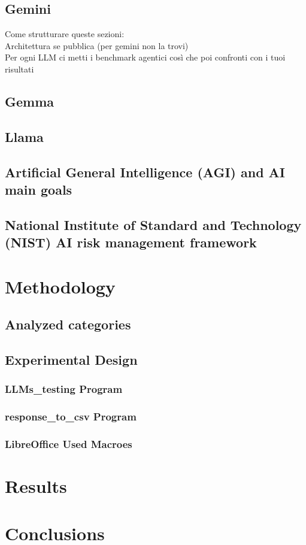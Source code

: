 \documentclass[12pt]{article}
\begin{document}
    \subsection{Gemini}
    Come strutturare queste sezioni:\\
Architettura se pubblica (per gemini non la trovi)\\
Per ogni LLM ci metti i benchmark agentici così che poi confronti con i tuoi risultati\\
    \subsection{Gemma}
         
    \subsection{Llama}
        
    
    \subsection{Artificial General Intelligence (AGI) and AI main goals}
    
    \subsection{National Institute of Standard and Technology (NIST) AI risk management framework}

     
     
\clearpage
\section{Methodology}
    \subsection{Analyzed categories}
    \subsection{Experimental Design}
        \subsubsection{LLMs\_testing Program}
        \subsubsection{response\_to\_csv Program}
        \subsubsection{LibreOffice Used Macroes}
        
\clearpage
\section{Results}

\clearpage
\section{Conclusions}

\clearpage
\printbibliography
\clearpage
\end{document}
